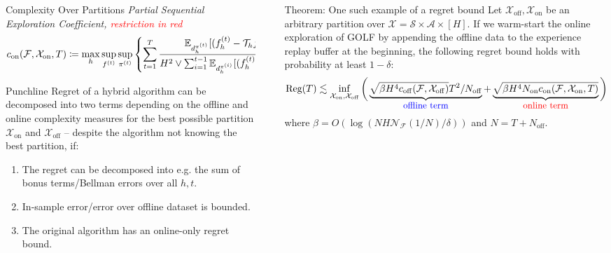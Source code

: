 \documentclass[final]{beamer}
\newcommand{\off}{\operatorname{off}}
\newcommand{\on}{\operatorname{on}}
\newcommand{\gX}{\mathcal{X}}
\newcommand{\gA}{\mathcal{A}}
\newcommand{\gS}{\mathcal{S}}
\newcommand{\gF}{\mathcal{F}}
\newcommand{\gT}{\mathcal{T}}
\newcommand{\Reg}{\text{Reg}}
\newlength{\sepwidth}
\newlength{\colwidth}
\newcommand{\separatorcolumn}{\begin{column}{\sepwidth}\end{column}}
\begin{document}
\begin{frame}[t]
\begin{columns}[t]
\begin{column}{\colwidth}
\begin{block}{Complexity Over Partitions}
    \textit{Partial Sequential Exploration Coefficient, \textcolor{red}{restriction in red}}
    $$c_{\on}(\gF, \gX_{\on},T) 
    \coloneqq \max_{h} \sup_{f^{(t)}} \sup_{\pi^{(t)}} 
    \left\{\sum_{t=1}^T \frac{ \E_{d_h^{\pi^{(t)}}}[(f_h^{(t)} - \gT_h f_{h+1}^{(t)}) \tcbhighmath[colframe=red]{\mathbbm{1}_{(\cdot, h) \in \gX_{\on}}}]^2}{H^2 \vee \sum_{i=1}^{t-1} \E_{d_h^{\pi^{(i)}}}[(f_h^{(t)} - \gT_h f_{h+1}^{(t)})^2 \tcbhighmath[colframe=red]{\mathbbm{1}_{(\cdot, h) \in \gX_{\on}}}]}\right\}.$$

  \end{block}

    \begin{alertblock}{Punchline}
        Regret of a hybrid algorithm can be decomposed into two terms depending on the offline and online complexity measures for the best possible partition $\gX_{\on}$ and $\gX_{\off}$ -- despite the algorithm not knowing the best partition, if:
        \vspace{-3ex}
        \begin{enumerate}
            \item The regret can be decomposed into e.g. the sum of bonus terms/Bellman errors over all $h, t$.
            \item In-sample error/error over offline dataset is bounded.
            \item The original algorithm has an online-only regret bound.
        \end{enumerate}
    \end{alertblock}

\end{column}

\separatorcolumn

\begin{column}{\colwidth}

    \begin{alertblock}{Theorem: One such example of a regret bound}
\label{thm:regret_bound}
Let $\gX_{\off}, \gX_{\on}$ be an arbitrary partition over $\gX = \gS \times \gA \times [H]$. 
If we warm-start the online exploration of GOLF \cite{jin2021bellmaneluder, xie2022role} by appending the offline data to the experience replay buffer at the beginning, the following regret bound holds with probability at least $1-\delta$: 
\begin{align*}
    \Reg(T)
    \lesssim \inf_{\gX_{\on}, \gX_{\off}} \bigg(\underbrace{\sqrt{\beta H^4 c_{\off}(\gF, \gX_{\off})} T^2/N_{\off}}_{\textcolor{blue}{\text{\small{offline term}}}} + \underbrace{\sqrt{\beta H^4 N_{\on} c_{\on}(\gF, \gX_{\on}, T)}}_{\textcolor{red}{\text{\small{online term}}}}\bigg),
\end{align*} 
where 
$\beta = O(\log (N H \mathcal{N}_{\mathcal{F}}(1/N) / \delta))$ and $N = T + N_{\off}$.
\end{alertblock}




\end{column}
\end{columns}
\end{frame}
\end{document}
